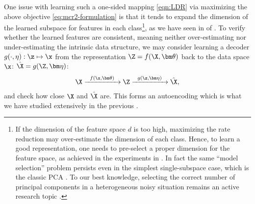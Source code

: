 \documentclass[../../book-main.tex]{subfiles}
\begin{document}
One issue with learning such a one-sided mapping \eqref{eqn:LDR} via maximizing the above objective \eqref{eq:mcr2-formulation} is that it tends to expand the dimension of the learned subspace for features in each class\footnote{If the dimension of the feature space $d$ is too high, maximizing the rate reduction may over-estimate the dimension of each class. Hence, to learn a good representation, one needs to pre-select a proper dimension for the feature space, as achieved in the experiments in \cite{yu2020learning}. In fact the same ``model selection'' problem persists even in the simplest single-subspace case, which is the classic PCA \cite{Jolliffe1986}. To our best knowledge, selecting the correct number of principal components in a heterogeneous noisy situation remains an active research topic \cite{hong2020selecting}.}, as we have seen in  of . To verify whether the learned features are consistent, meaning neither over-estimating nor under-estimating the intrinsic data structure, we may consider learning a decoder $g(\cdot,\eta): \z \mapsto  \x$ from the representation $\Z = f(\X,\bm\theta)$ back to the data space $\x$: $\hat \X = g(\Z, \bm\eta)$:
\begin{equation}
    \X \xrightarrow{\hspace{2mm} f(\x, \bm\theta)\hspace{2mm}} \Z \xrightarrow{\hspace{2mm} g(\z, \bm \eta) \hspace{2mm}} \hat \X, 
    \label{eqn:autoencoding-ch6}
\end{equation}
and check how close $\X$ and $\hat \X$ are. This forms an autoencoding which is what we have studied extensively in the previous .
\end{document}
